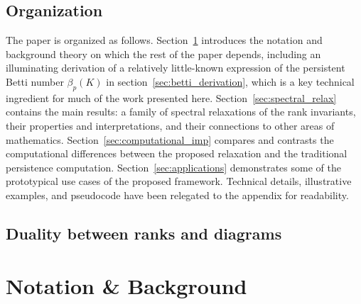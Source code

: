 \documentclass[10pt]{article}
\numberwithin{equation}{section}
\newcommand{\+}{%
	\raisebox{0.18ex}{\scaleobj{0.55}{+}}
}
\theoremstyle{definition}
\theoremstyle{definition}
\begin{document}
\subsection{Organization}
The paper is organized as follows. 
Section~\ref{sec:background_notation} introduces the notation and background theory on which the rest of the paper depends, including an illuminating derivation of a relatively little-known expression of the persistent Betti number $\beta_p(K)$ in section~\ref{sec:betti_derivation}, which is a key technical ingredient for much of the work presented here.
Section~\ref{sec:spectral_relax} contains the main results: a family of spectral relaxations of the rank invariants, their properties and interpretations, and their connections to other areas of mathematics. 
Section~\ref{sec:computational_imp} compares and contrasts the computational differences between the proposed relaxation and the traditional persistence computation.
Section~\ref{sec:applications} demonstrates some of the prototypical use cases of the proposed framework.
Technical details, illustrative examples, and pseudocode have been relegated to the appendix for readability.

\subsection*{Duality between ranks and diagrams}\label{sec:duality_pbn_dgm}





\section{Notation \& Background}\label{sec:background_notation}

\end{document}
